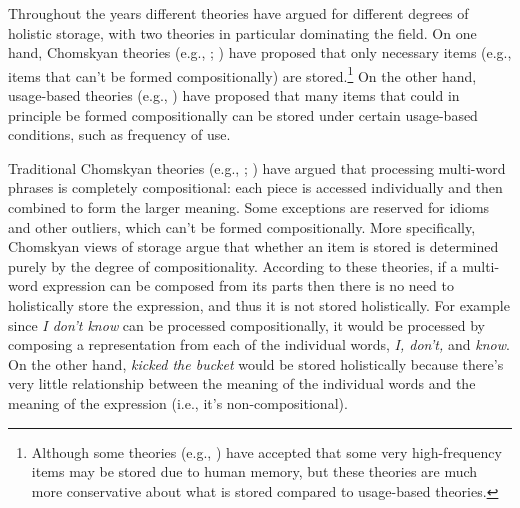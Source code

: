 \documentclass[
  12pt,
  letterpaper,
]{scrreport}
\begin{document}
Throughout the years different theories have argued for different
degrees of holistic storage, with two theories in particular dominating
the field. On one hand, Chomskyan theories (e.g.,
;
) have proposed that
only necessary items (e.g., items that can't be formed compositionally)
are stored.\footnote{Although some theories (e.g.,
  ) have accepted that
  some very high-frequency items may be stored due to human memory, but
  these theories are much more conservative about what is stored
  compared to usage-based theories.} On the other hand, usage-based
theories (e.g., ) have proposed
that many items that could in principle be formed compositionally can be
stored under certain usage-based conditions, such as frequency of use.

Traditional Chomskyan theories (e.g.,
;
) have argued that
processing multi-word phrases is completely compositional: each piece is
accessed individually and then combined to form the larger meaning. Some
exceptions are reserved for idioms and other outliers, which can't be
formed compositionally. More specifically, Chomskyan views of storage
argue that whether an item is stored is determined purely by the degree
of compositionality. According to these theories, if a multi-word
expression can be composed from its parts then there is no need to
holistically store the expression, and thus it is not stored
holistically. For example since \emph{I don't know} can be processed
compositionally, it would be processed by composing a representation
from each of the individual words, \emph{I, don't,} and \emph{know}. On
the other hand, \emph{kicked the bucket} would be stored holistically
because there's very little relationship between the meaning of the
individual words and the meaning of the expression (i.e., it's
non-compositional).
\end{document}
